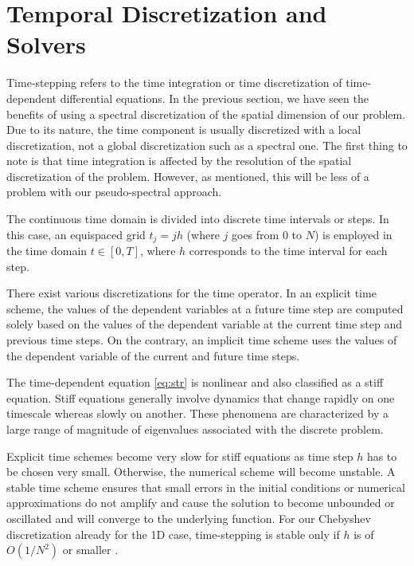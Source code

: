 
\section{Temporal Discretization and Solvers} \label{sec:time}

Time-stepping refers to the time integration or time discretization of
time-dependent differential equations. In the previous section, we have seen
the benefits of using a spectral discretization of the spatial dimension of our
problem. Due to its nature, the time component is usually discretized with a
local discretization, not a global discretization such as a spectral one. The
first thing to note is that time integration is affected by the resolution of
the spatial discretization of the problem. However, as mentioned, this will be
less of a problem with our pseudo-spectral approach.

The continuous time domain is divided into discrete time intervals or steps. In
this case, an equispaced grid $t_j = jh$ (where $j$ goes from $0$ to $N$) is
employed in the time domain $t \in [0, T]$, where $h$ corresponds to the time
interval for each step.

There exist various discretizations for the time operator. In an explicit time
scheme, the values of the dependent variables at a future time step are
computed solely based on the values of the dependent variable at the current
time step and previous time steps. On the contrary, an implicit time scheme
uses the values of the dependent variable of the current and future time steps.

The time-dependent equation \eqref{eq:str} is nonlinear and also classified as
a stiff equation. Stiff equations generally involve dynamics that change
rapidly on one timescale whereas slowly on another. These phenomena are
characterized by a large range of magnitude of eigenvalues associated with the
discrete problem.

Explicit time schemes become very slow for stiff equations as time step $h$ has
to be chosen very small. Otherwise, the numerical scheme will become unstable.
A stable time scheme ensures that small errors in the initial conditions or
numerical approximations do not amplify and cause the solution to become
unbounded or oscillated and will converge to the underlying function. For our
Chebyshev discretization already for the 1D case, time-stepping is stable only
if $h$ is of $O(1/N^2)$ or smaller \citep{boyd2001}.

